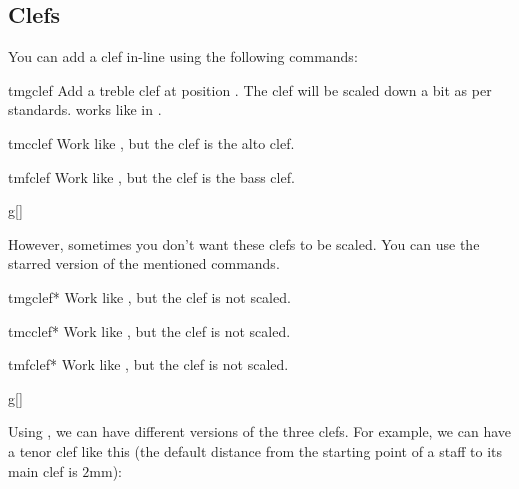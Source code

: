 \documentclass[11pt,a4paper]{ltxdoc}
\begin{document}
\subsection{Clefs}\label{sec:inline:clef}
You can add a clef in-line using the following commands:
\begin{docCommand}{tmgclef}{}
  Add a treble clef at position . The clef will be scaled down a bit 
  as per standards.  works like in .
\end{docCommand}
\begin{docCommand}{tmcclef}{}
  Work like , but the clef is the alto clef.
\end{docCommand}
\begin{docCommand}{tmfclef}{}
  Work like , but the clef is the bass clef.
\end{docCommand}
\begin{dispExample}
\begin{tmsinglestaff}
  \begin{tmstaff}{g}[]
  \end{tmstaff}
\end{tmsinglestaff}
\end{dispExample}
However, sometimes you don't want these clefs to be scaled. You can use the 
starred version of the mentioned commands.
\begin{docCommand}{tmgclef*}{}
  Work like , but the clef is not scaled.
\end{docCommand}
\begin{docCommand}{tmcclef*}{}
  Work like , but the clef is not scaled.
\end{docCommand}
\begin{docCommand}{tmfclef*}{}
  Work like , but the clef is not scaled.
\end{docCommand}
\begin{dispExample}
\begin{tmsinglestaff}
  \begin{tmstaff}{g}[]
  \end{tmstaff}%
\end{tmsinglestaff}
\end{dispExample}
Using , we can have different versions of the three clefs. For example, 
we can have a tenor clef like this (the default distance from the starting point 
of a staff to its main clef is $2$mm):
\begin{dispExample}
\begin{tmsinglestaff}
  \begin{tmstaff*}[]
  \end{tmstaff*}
\end{tmsinglestaff}
\end{dispExample}
\end{document}
